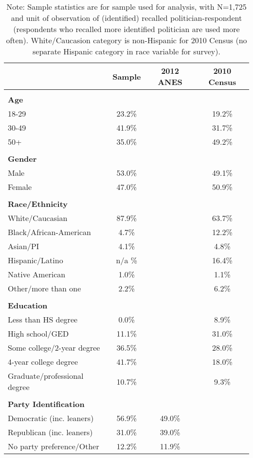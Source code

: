 \documentclass[12pt, letterpaper]{article}
\begin{document}
\begin{table}[ht]
\small
\caption{Sample Demographics Compared to Benchmarks}
\centering
\label{si_survey_dem}
\begin{tabular}{l c c c}
\hline
& Sample & 2012 ANES & 2010 Census\\
\hline
& & &\\
\textbf{Age} & & &\\
18-29 & 23.2\% & & 19.2\%\\
30-49 & 41.9\% & & 31.7\%\\
50+ & 35.0\% & & 49.2\%\\
& & &\\
\textbf{Gender} & & &\\
Male & 53.0\% & & 49.1\%\\
Female & 47.0\% & & 50.9\%\\
& & &\\
\textbf{Race/Ethnicity} & & &\\
White/Caucasian & 87.9\% & & 63.7\% \\
Black/African-American & 4.7\% & & 12.2\%\\
Asian/PI & 4.1\% & & 4.8\%\\
Hispanic/Latino & n/a \% & & 16.4\%\\
Native American & 1.0\% & & 1.1\%\\
Other/more than one & 2.2\% & & 6.2\%\\
& & &\\
\textbf{Education} & & &\\
Less than HS degree & 0.0\% & & 8.9\%\\
High school/GED & 11.1\% & & 31.0\%\\
Some college/2-year degree & 36.5\% & &28.0\%\\
4-year college degree & 41.7\% & & 18.0\%\\
Graduate/professional degree & 10.7\% & & 9.3\%\\
& & &\\
\textbf{Party Identification} & & &\\
Democratic (inc. leaners) & 56.9\% & 49.0\% &\\
Republican (inc. leaners) & 31.0\% & 39.0\% &\\
No party preference/Other & 12.2\% & 11.9\% &\\
\hline
\end{tabular}
\caption*{Note: Sample statistics are for sample used for analysis, with N=1,725 and unit of observation of (identified) recalled politician-respondent (respondents who recalled more identified politician are used more often).  White/Caucasion category is non-Hispanic for 2010 Census (no separate Hispanic category in race variable for survey).}
\end{table}
\clearpage
\end{document}
